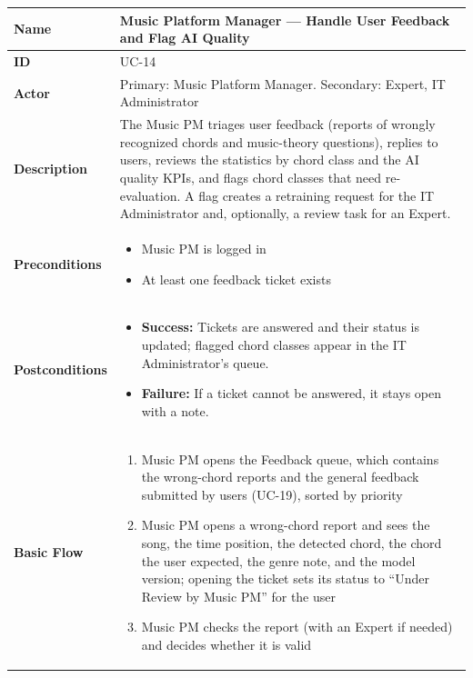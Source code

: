 \documentclass[a4paper]{article}
\newlength{\ucLeft}
\begin{document}
\begin{longtable}{|>{\bfseries}p{\ucLeft}|p{\dimexpr\linewidth-\ucLeft-2\tabcolsep-2\arrayrulewidth}|}
\hline
Name & Music Platform Manager --- Handle User Feedback and Flag AI Quality \\ \hline
ID & UC-14 \\ \hline
Actor & Primary: Music Platform Manager. Secondary: Expert, IT Administrator \\ \hline
Description & The Music PM triages user feedback (reports of wrongly recognized chords and music-theory questions), replies to users, reviews the statistics by chord class and the AI quality KPIs, and flags chord classes that need re-evaluation. A flag creates a retraining request for the IT Administrator and, optionally, a review task for an Expert. \\ \hline
Preconditions &
\begin{itemize}[leftmargin=1em, nosep, topsep=2pt, partopsep=0pt, parsep=0pt, after=\strut]
    \item Music PM is logged in
    \item At least one feedback ticket exists
\end{itemize}
\\ \hline
Postconditions &
\begin{itemize}[leftmargin=1em, nosep, topsep=2pt, partopsep=0pt, parsep=0pt, after=\strut]
    \item \textbf{Success:} Tickets are answered and their status is updated; flagged chord classes appear in the IT Administrator's queue.
    \item \textbf{Failure:} If a ticket cannot be answered, it stays open with a note.
\end{itemize}
\\ \hline
Basic Flow &
\begin{enumerate}[leftmargin=1.5em, nosep, topsep=2pt, partopsep=0pt, parsep=0pt, after=\strut]
    \item Music PM opens the Feedback queue, which contains the wrong-chord reports and the general feedback submitted by users (UC-19), sorted by priority
    \item Music PM opens a wrong-chord report and sees the song, the time position, the detected chord, the chord the user expected, the genre note, and the model version; opening the ticket sets its status to ``Under Review by Music PM'' for the user
    \item Music PM checks the report (with an Expert if needed) and decides whether it is valid

\end{enumerate}
\end{longtable}
\end{document}
